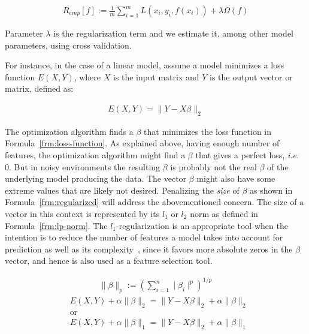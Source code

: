 \begin{align}
  R_{emp}[f] := \frac{1}{m}\sum_{i = 1}^{m} L(x_i, y_i, f(x_i)) + \lambda \Omega(f)
  \label{frm:bkg:emp-regularized}
\end{align}

Parameter $\lambda$ is the regularization term and we estimate it, among other model parameters, using cross validation.

For instance, in the case of a linear model, assume a model minimizes a loss function $E(X, Y)$, where $X$ is the input matrix and $Y$ is the output vector or matrix, defined as:

\begin{align}
  E(X, Y) = \parallel Y - X \beta \parallel_2
  \label{frm:loss-function}
\end{align}

The optimization algorithm finds a $\beta$ that minimizes the loss function in Formula~\ref{frm:loss-function}. As explained above, having enough number of features, the optimization algorithm might find a $\beta$ that gives a perfect loss, \emph{i.e.} 0. But in noisy environments the resulting $\beta$ is probably not the real $\beta$ of the underlying model producing the data. The vector $\beta$ might also have some extreme values that are likely not desired. Penalizing the \emph{size} of $\beta$ as shown in Formula~\ref{frm:regularized} will address the abovementioned concern. The size of a vector in this context is represented by its $l_1$ or $l_2$ norm as defined in Formula~\ref{frm:lp-norm}. The $l_1$-regularization is an appropriate tool when the intention is to reduce the number of features a model takes into account for prediction as well as its complexity~\cite{l1-regularized}, since it favors more absolute zeros in the $\beta$ vector, and hence is also used as a feature selection tool.

\begin{align}
  \parallel \beta \parallel_p := \left(\sum\limits_{i=1}^n \mid \beta_i \mid^p \right)^{1/p}
  \label{frm:lp-norm}
\end{align}
\begin{align}
  &E(X, Y) + \alpha \parallel \beta \parallel_2 = \parallel Y - X \beta \parallel_2 + \alpha \parallel \beta \parallel_2 \nonumber \\
  &\text{or} \nonumber \\
  &E(X, Y) + \alpha \parallel \beta \parallel_1 = \parallel Y - X \beta \parallel_2 + \alpha \parallel \beta \parallel_1
  \label{frm:regularized}
\end{align}

